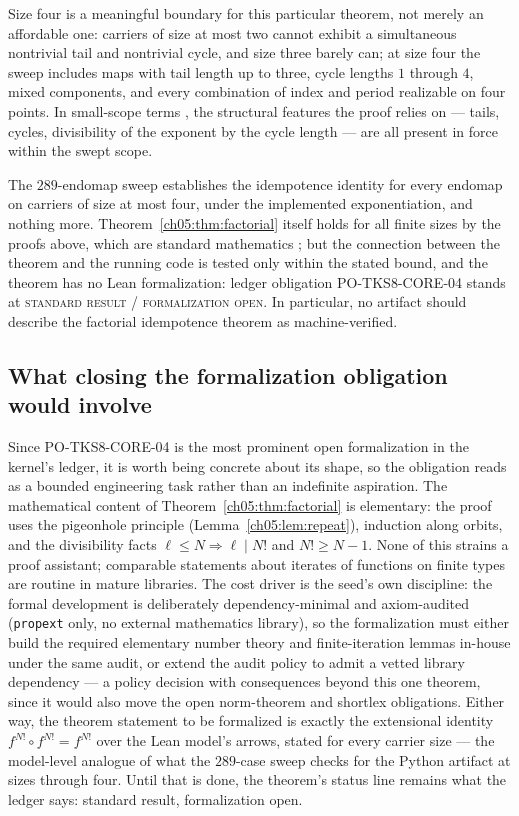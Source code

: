 Size four is a meaningful boundary for this particular theorem, not merely
an affordable one: carriers of size at most two cannot exhibit a
simultaneous nontrivial tail and nontrivial cycle, and size three barely
can; at size four the sweep includes maps with tail length up to three,
cycle lengths $1$ through $4$, mixed components, and every combination of
index and period realizable on four points. In small-scope terms
\cite{jackson}, the structural features the proof relies on --- tails,
cycles, divisibility of the exponent by the cycle length --- are all
present in force within the swept scope.

\begin{boundary}
\label{ch05:bound:testing}
The $289$-endomap sweep establishes the idempotence identity for every
endomap on carriers of size at most four, under the implemented
exponentiation, and nothing more. Theorem~\ref{ch05:thm:factorial} itself
holds for all finite sizes by the proofs above, which are standard
mathematics \cite{pin, howie}; but the connection between the theorem and
the running code is tested only within the stated bound, and the theorem
has no Lean formalization: ledger obligation PO-TKS8-CORE-04 stands at
\textsc{standard result / formalization open}. In particular, no artifact
should describe the factorial idempotence theorem as machine-verified.
\end{boundary}

\subsection{What closing the formalization obligation would involve}
\label{ch05:sec:po04}

Since PO-TKS8-CORE-04 is the most prominent open formalization in the
kernel's ledger, it is worth being concrete about its shape, so the
obligation reads as a bounded engineering task rather than an indefinite
aspiration. The mathematical content of
Theorem~\ref{ch05:thm:factorial} is elementary: the proof uses the
pigeonhole principle (Lemma~\ref{ch05:lem:repeat}), induction along
orbits, and the divisibility facts $\ell \le N \Rightarrow \ell \mid N!$
and $N! \ge N - 1$. None of this strains a proof assistant; comparable
statements about iterates of functions on finite types are routine in
mature libraries. The cost driver is the seed's own discipline: the
formal development is deliberately dependency-minimal and axiom-audited
(\texttt{propext} only, no external mathematics library), so the
formalization must either build the required elementary number theory
and finite-iteration lemmas in-house under the same audit, or extend the
audit policy to admit a vetted library dependency --- a policy decision
with consequences beyond this one theorem, since it would also move the
open norm-theorem and shortlex obligations. Either way, the theorem
statement to be formalized is exactly the extensional identity
$f^{N!} \circ f^{N!} = f^{N!}$ over the Lean model's arrows, stated for
every carrier size --- the model-level analogue of what the $289$-case
sweep checks for the Python artifact at sizes through four. Until that
is done, the theorem's status line remains what the ledger says:
standard result, formalization open.

